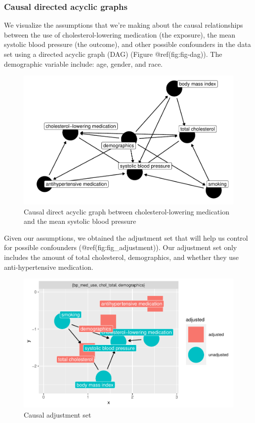 \documentclass[useAMS,usenatbib,referee]{biom}
\begin{document}
\hypertarget{dags}{%
\subsubsection{Causal directed acyclic graphs}\label{dags}}

We visualize the assumptions that we're making about the causal
relationships between the use of cholesterol-lowering medication (the
exposure), the mean systolic blood pressure (the outcome), and other
possible confounders in the data set using a directed acyclic graph
(DAG) (Figure @ref(fig:fig-dag)). The demographic variable include: age,
gender, and race.

\begin{figure}
\centering
\includegraphics{final-project_files/figure-latex/fig-dag-1.pdf}
\caption{Causal direct acyclic graph between cholesterol-lowering
medication and the mean systolic blood pressure}
\end{figure}

Given our assumptions, we obtained the adjustment set that will help us
control for possible confounders (@ref(fig:fig\_adjustment)). Our
adjustment set only includes the amount of total cholesterol,
demographics, and whether they use anti-hypertensive medication.

\begin{figure}
\centering
\includegraphics{final-project_files/figure-latex/fig_adjustment-1.pdf}
\caption{Causal adjustment set}
\end{figure}
\end{document}
